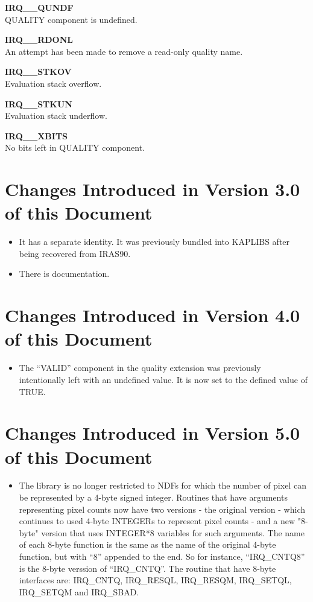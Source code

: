 \documentclass[twoside,11pt,nolof]{starlink}
\begin{document}
\begin{description}
\item \textbf{IRQ\_\_QUNDF}\\
QUALITY component is undefined.
\item \textbf{IRQ\_\_RDONL}\\
An attempt has been made to remove a read-only quality name.
\item \textbf{IRQ\_\_STKOV}\\
Evaluation stack overflow.
\item \textbf{IRQ\_\_STKUN}\\
Evaluation stack underflow.
\item \textbf{IRQ\_\_XBITS}\\
No bits left in QUALITY component.
\end{description}

\section {Changes Introduced in Version 3.0 of this Document}

\begin{itemize}
   \item It has a separate identity.  It was previously bundled into
   KAPLIBS after being recovered from IRAS90.
   \item There is documentation.
\end{itemize}

\section {Changes Introduced in Version 4.0 of this Document}
\label {SEC:CHANGES}

\begin{itemize}
   \item The ``VALID'' component in the quality extension was previously
   intentionally left with an undefined value. It is now set to the
   defined value of TRUE.
\end{itemize}

\section {Changes Introduced in Version 5.0 of this Document}
\label {SEC:CHANGES}

\begin{itemize}
   \item The library is no longer restricted to NDFs for which the number
   of pixel can be represented by a 4-byte signed integer. Routines that
   have arguments representing pixel counts now have two versions - the
   original version - which continues to used 4-byte INTEGERs to represent
   pixel counts - and a new "8-byte" version that uses INTEGER*8 variables
   for such arguments. The name of each 8-byte function is the same as the
   name of the original 4-byte function, but with ``8'' appended to the
   end. So for instance, ``IRQ\_CNTQ8'' is the 8-byte verssion of
   ``IRQ\_CNTQ''. The routine that have 8-byte interfaces are:
   IRQ\_CNTQ, IRQ\_RESQL, IRQ\_RESQM, IRQ\_SETQL, IRQ\_SETQM and
   IRQ\_SBAD.
\end{itemize}
\end{document}
